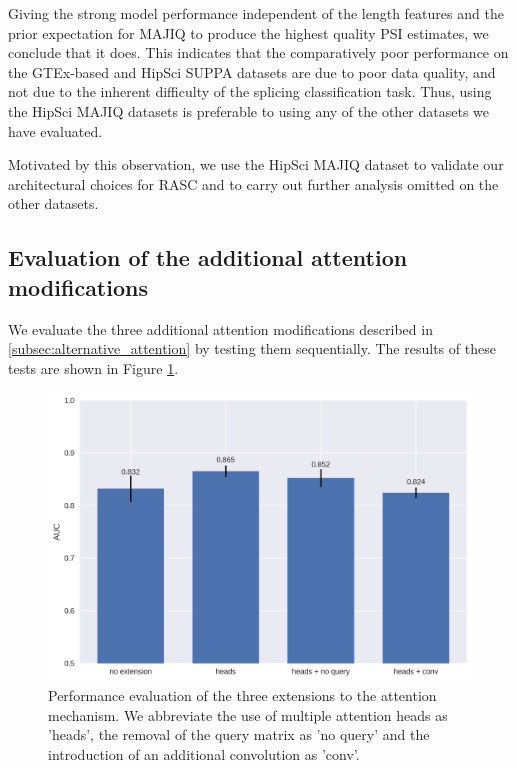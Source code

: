 Giving the strong model performance independent of the length features and the prior expectation for MAJIQ to produce the highest quality PSI estimates, we conclude that it does. This indicates that the comparatively poor performance on the GTEx-based and HipSci SUPPA datasets are due to poor data quality, and not due to the inherent difficulty of the splicing classification task. Thus, using the HipSci MAJIQ datasets is preferable to using any of the other datasets we have evaluated. 

Motivated by this observation, we use the HipSci MAJIQ dataset to validate our architectural choices for RASC and to carry out further analysis omitted on the other datasets.





\subsection{Evaluation of the additional attention modifications} \label{subsubsec:attn_hyperparams}

We evaluate the three additional attention modifications described in \ref{subsec:alternative_attention} by testing them sequentially. The results of these tests are shown in Figure \ref{fig:attn_extension_barcharts}. 

\begin{figure}
	\centering\includegraphics[width=1\textwidth]{../visualizations/ch5-results/attn_extension_barcharts.png} 
	\caption{Performance evaluation of the three extensions to the attention mechanism. We abbreviate the use of multiple attention heads as 'heads', the removal of the query matrix as 'no query' and the introduction of an additional convolution as 'conv'. }
	\label{fig:attn_extension_barcharts}
\end{figure}



